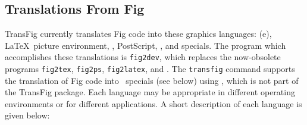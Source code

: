 \subsection{Translations From Fig}
TransFig currently translates Fig code into these graphics languages:
	{\sc (e)}\EPIC, \LaTeX\  picture environment, \PicTeX, PostScript,
	\PIC, and \textyl specials.
The program which accomplishes these translations is {\tt fig2dev},
	which replaces the now-obsolete programs
	{\tt fig2tex}, {\tt fig2ps}, {\tt fig2latex}, and
	.
The {\tt transfig} command supports the translation of Fig code into
	\tpic\ specials (see below) using \tpic,
	which is not part of the TransFig package.
Each language may be appropriate in different operating environments
	or for different applications.
A short description of each language is given below:
%
